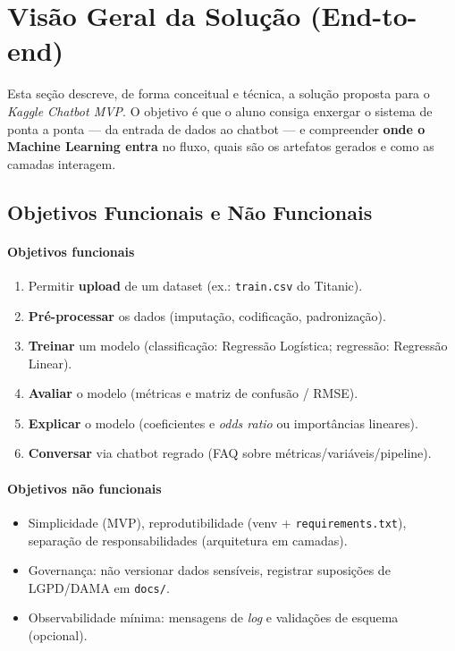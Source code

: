 \documentclass[12pt,a4paper]{article}
\begin{document}
\clearpage
\section{Visão Geral da Solução (End-to-end)}

Esta seção descreve, de forma conceitual e técnica, a solução proposta para o \textit{Kaggle Chatbot MVP}. O objetivo é que o aluno consiga enxergar o sistema de ponta a ponta --- da entrada de dados ao chatbot --- e compreender \textbf{onde o Machine Learning entra} no fluxo, quais são os artefatos gerados e como as camadas interagem.

\subsection{Objetivos Funcionais e Não Funcionais}

\paragraph{Objetivos funcionais}
\begin{enumerate}
  \item Permitir \textbf{upload} de um dataset (ex.: \texttt{train.csv} do Titanic).
  \item \textbf{Pré-processar} os dados (imputação, codificação, padronização).
  \item \textbf{Treinar} um modelo (classificação: Regressão Logística; regressão: Regressão Linear).
  \item \textbf{Avaliar} o modelo (métricas e matriz de confusão / RMSE).
  \item \textbf{Explicar} o modelo (coeficientes e \textit{odds ratio} ou importâncias lineares).
  \item \textbf{Conversar} via chatbot regrado (FAQ sobre métricas/variáveis/pipeline).
\end{enumerate}

\paragraph{Objetivos não funcionais}
\begin{itemize}
  \item Simplicidade (MVP), reprodutibilidade (venv + \texttt{requirements.txt}), separação de responsabilidades (arquitetura em camadas).
  \item Governança: não versionar dados sensíveis, registrar suposições de LGPD/DAMA em \texttt{docs/}.
  \item Observabilidade mínima: mensagens de \textit{log} e validações de esquema (opcional).
\end{itemize}
\end{document}
